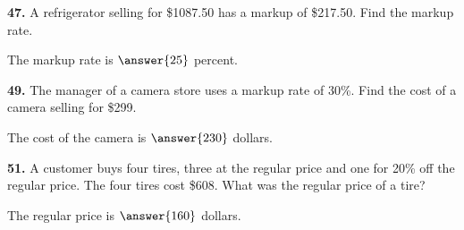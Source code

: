\documentclass{ximera}
\begin{document}
\begin{problem}
\textbf{47.} A refrigerator selling for \$1087.50 has a markup of \$217.50. Find the markup
  rate.

The markup rate is $\answer{25}$ percent.
\end{problem}

\begin{problem}
\textbf{49.} The manager of a camera store uses a markup rate of 30\%. Find the cost of a
  camera selling for \$299.

The cost of the camera is $\answer{230}$ dollars.
\end{problem}

\begin{problem}
\textbf{51.} A customer buys four tires, three at the regular price and one for 20\% off the
  regular price. The four tires cost \$608. What was the regular price of a tire?

The regular price is $\answer{160}$ dollars.
\end{problem}
\end{document}
